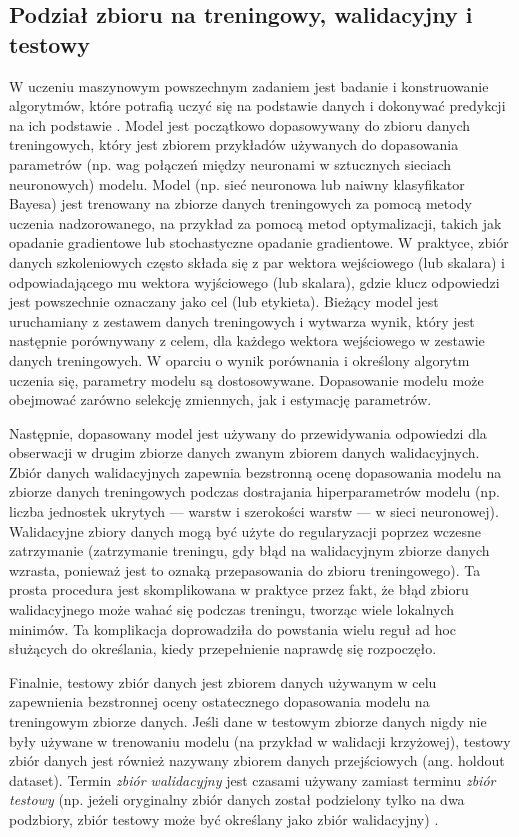 \documentclass[polish, twoside, 12pt, a4paper]{article}
\theoremstyle{definition}
\theoremstyle{plain}
\theoremstyle{remark}
\begin{document}
\subsection{Podział zbioru na treningowy, walidacyjny i testowy}
\label{chapter:train-test-split}
W uczeniu maszynowym powszechnym zadaniem jest badanie i konstruowanie algorytmów, które potrafią uczyć się na podstawie danych i dokonywać predykcji na ich podstawie \citep{kohavi1998}. Model jest początkowo dopasowywany do zbioru danych treningowych, który jest zbiorem przykładów używanych do dopasowania parametrów (np. wag połączeń między neuronami w sztucznych sieciach neuronowych) modelu. Model (np. sieć neuronowa lub naiwny klasyfikator Bayesa) jest trenowany na zbiorze danych treningowych za pomocą metody uczenia nadzorowanego, na przykład za pomocą metod optymalizacji, takich jak opadanie gradientowe lub stochastyczne opadanie gradientowe. W praktyce, zbiór danych szkoleniowych często składa się z par wektora wejściowego (lub skalara) i odpowiadającego mu wektora wyjściowego (lub skalara), gdzie klucz odpowiedzi jest powszechnie oznaczany jako cel (lub etykieta). Bieżący model jest uruchamiany z zestawem danych treningowych i wytwarza wynik, który jest następnie porównywany z celem, dla każdego wektora wejściowego w zestawie danych treningowych. W oparciu o wynik porównania i określony algorytm uczenia się, parametry modelu są dostosowywane. Dopasowanie modelu może obejmować zarówno selekcję zmiennych, jak i estymację parametrów.

Następnie, dopasowany model jest używany do przewidywania odpowiedzi dla obserwacji w drugim zbiorze danych zwanym zbiorem danych walidacyjnych. Zbiór danych walidacyjnych zapewnia bezstronną ocenę dopasowania modelu na zbiorze danych treningowych podczas dostrajania hiperparametrów modelu (np. liczba jednostek ukrytych --- warstw i szerokości warstw --- w sieci neuronowej). Walidacyjne zbiory danych mogą być użyte do regularyzacji poprzez wczesne zatrzymanie (zatrzymanie treningu, gdy błąd na walidacyjnym zbiorze danych wzrasta, ponieważ jest to oznaką przepasowania do zbioru treningowego). Ta prosta procedura jest skomplikowana w praktyce przez fakt, że błąd zbioru walidacyjnego może wahać się podczas treningu, tworząc wiele lokalnych minimów. Ta komplikacja doprowadziła do powstania wielu reguł ad hoc służących do określania, kiedy przepełnienie naprawdę się rozpoczęło.

Finalnie, testowy zbiór danych jest zbiorem danych używanym w celu zapewnienia bezstronnej oceny ostatecznego dopasowania modelu na treningowym zbiorze danych. Jeśli dane w testowym zbiorze danych nigdy nie były używane w trenowaniu modelu (na przykład w walidacji krzyżowej), testowy zbiór danych jest również nazywany zbiorem danych przejściowych (ang. holdout dataset). Termin \emph{zbiór walidacyjny} jest czasami używany zamiast terminu \emph{zbiór testowy} (np. jeżeli oryginalny zbiór danych został podzielony tylko na dwa podzbiory, zbiór testowy może być określany jako zbiór walidacyjny) \citep{brownlee2017}.
\end{document}
